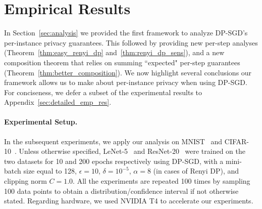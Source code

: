 \section{Empirical Results}
\label{sec:main_body_emp_results}


In Section~\ref{sec:analysis} we provided the first framework to analyze DP-SGD's per-instance privacy guarantees. This followed by providing new per-step analyses (Theorem~\ref{thm:easy_renyi_dp} and~\ref{thm:renyi_dp_sens}), and a new composition theorem that relies on summing ``expected" per-step guarantees (Theorem~\ref{thm:better_composition}). 
We now highlight several conclusions our framework allows us to make about per-instance privacy when using DP-SGD. For conciseness, we defer a subset of the experimental results to Appendix~\ref{sec:detailed_emp_res}. %





\paragraph{Experimental Setup.} In the subsequent experiments, we apply our analysis on MNIST~\citep{lecun1998mnist} and CIFAR-10~\citep{krizhevsky2009learning}. Unless otherwise specified, LeNet-5~\citep{lecun1989backpropagation} and ResNet-20~\citep{he2016deep} were trained on the two datasets for 10 and 200 epochs respectively using DP-SGD, with a mini-batch size equal to 128, $\epsilon=10$, $\delta = 10^{-5}$, $\alpha = 8$ (in cases of Renyi DP), and clipping norm $C = 1.0$. All the experiments are repeated 100 times by sampling 100 data points to obtain a distribution/confidence interval if not otherwise stated.
Regarding hardware, we used NVIDIA T4 to accelerate our experiments. 


